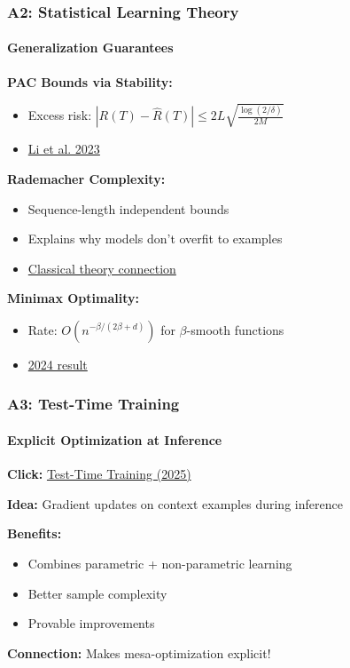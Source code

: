 \documentclass[10pt,aspectratio=169]{beamer}
\begin{document}
\begin{frame}
\frametitle{A2: Statistical Learning Theory}
\framesubtitle{Generalization Guarantees}

\textbf{PAC Bounds via Stability:}
\begin{itemize}
    \item Excess risk: $|R(T) - \hat{R}(T)| \leq 2L\sqrt{\frac{\log(2/\delta)}{2M}}$
    \item \href{run:./papers/mlr_press_li2023.md}{\color{blue}Li et al. 2023}
\end{itemize}

\vspace{0.5cm}
\textbf{Rademacher Complexity:}
\begin{itemize}
    \item Sequence-length independent bounds
    \item Explains why models don't overfit to examples
    \item \href{run:./papers/games_automata_vc_dimension.md}{\color{blue}Classical theory connection}
\end{itemize}

\vspace{0.5cm}
\textbf{Minimax Optimality:}
\begin{itemize}
    \item Rate: $O(n^{-\beta/(2\beta+d)})$ for $\beta$-smooth functions
    \item \href{run:./papers/2408.12186_minimax_optimal.pdf}{\color{blue}2024 result}
\end{itemize}
\end{frame}

\begin{frame}
\frametitle{A3: Test-Time Training}
\framesubtitle{Explicit Optimization at Inference}

\begin{center}
\Large
\textbf{Click:} \href{run:./papers/2503.11842_test_time_training.pdf}{\color{blue}Test-Time Training (2025)}
\end{center}

\vspace{0.5cm}

\textbf{Idea:} Gradient updates on context examples during inference

\vspace{0.5cm}
\textbf{Benefits:}
\begin{itemize}
    \item Combines parametric + non-parametric learning
    \item Better sample complexity
    \item Provable improvements
\end{itemize}

\vspace{0.5cm}
\textbf{Connection:} Makes mesa-optimization explicit!
\end{frame}
\end{document}
